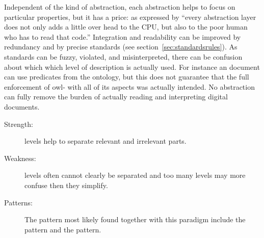 Independent of the kind of abstraction, each abstraction helps to focus on
particular properties, but it has a price: as expressed by \textcite{Yang2009}
``every abstraction layer does not only adds a little over head to the CPU, but
also to the poor human who has to read that code.'' Integration and readability
can be improved by redundancy and by precise standards (see
section~\ref{sec:standardsrules}). As standards can be fuzzy, violated, and
misinterpreted, there can be confusion about which which level of description
is actually used. For instance an  document can use predicates from
the  ontology, but this does not guarantee that the full enforcement
of owl- with all of its aspects was actually intended. No
abstraction can fully remove the burden of actually reading and interpreting
digital documents.

\begin{description}
\item[Strength:] levels help to separate relevant and irrelevant parts.
\item[Weakness:] levels often cannot clearly be separated and too many
  levels may more confuse then they simplify.
\item[Patterns:] The pattern most likely found together with
  this paradigm include the  pattern and the
   pattern.
\end{description}

